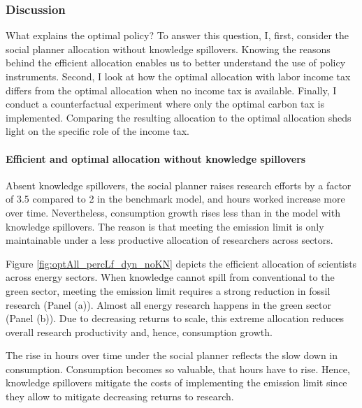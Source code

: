 \subsubsection{Discussion}\label{subsec:dis}

 What explains the optimal policy?  To answer this question, I, first, consider the social planner allocation without knowledge spillovers. Knowing the reasons behind the efficient allocation enables us to better understand the use of policy instruments. Second, I look at how the optimal allocation with labor income tax differs from the optimal allocation when no income tax is available. 
Finally, I conduct a counterfactual experiment where only the optimal carbon tax is implemented. Comparing the resulting allocation to the optimal allocation sheds light on the specific role of the income tax. 

\paragraph{Efficient and optimal allocation without knowledge spillovers}

Absent knowledge spillovers, the social planner raises research efforts  by a factor of 3.5 compared to 2 in the benchmark model, and hours worked increase more over time. Nevertheless, consumption growth rises less than in the model with knowledge spillovers. The reason is that meeting the emission limit is only maintainable under a less productive allocation of researchers across sectors. 

Figure \ref{fig:optAll_percLf_dyn_noKN} depicts the efficient allocation of scientists across energy sectors. When knowledge cannot spill from conventional to the green sector, meeting the emission limit requires a strong reduction in fossil research (Panel (a)). Almost all energy research happens in the green sector (Panel (b)). Due to decreasing returns to scale, this extreme allocation reduces overall research productivity and, hence, consumption growth.
 
The rise in hours over time under the social planner reflects the slow down in consumption. Consumption becomes so valuable, that hours have to rise. 
Hence, knowledge spillovers mitigate the costs of implementing the emission limit since they allow to mitigate decreasing returns to research. 

